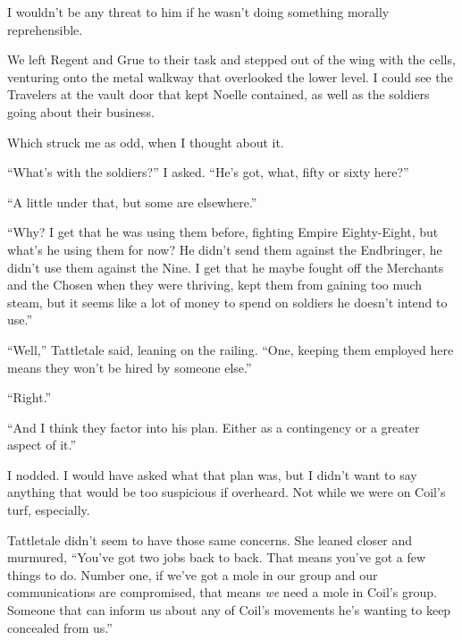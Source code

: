 I wouldn't be any threat to him if he wasn't doing something morally reprehensible.



We left Regent and Grue to their task and stepped out of the wing with the cells, venturing onto the metal walkway that overlooked the lower level.  I could see the Travelers at the vault door that kept Noelle contained, as well as the soldiers going about their business.



Which struck me as odd, when I thought about it.



``What's with the soldiers?'' I asked.  ``He's got, what, fifty or sixty here?''



``A little under that, but some are elsewhere.''



``Why?  I get that he was using them before, fighting Empire Eighty-Eight, but what's he using them for now?  He didn't send them against the Endbringer, he didn't use them against the Nine.  I get that he maybe fought off the Merchants and the Chosen when they were thriving, kept them from gaining too much steam, but it seems like a lot of money to spend on soldiers he doesn't intend to use.''



``Well,'' Tattletale said, leaning on the railing.  ``One, keeping them employed here means they won't be hired by someone else.''



``Right.''



``And I think they factor into his plan.  Either as a contingency or a greater aspect of it.''



I nodded.  I would have asked what that plan was, but I didn't want to say anything that would be too suspicious if overheard.  Not while we were on Coil's turf, especially.



Tattletale didn't seem to have those same concerns.  She leaned closer and murmured, ``You've got two jobs back to back.  That means you've got a few things to do.  Number one, if we've got a mole in our group and our communications are compromised, that means \emph{we} need a mole in Coil's group.  Someone that can inform us about any of Coil's movements he's wanting to keep concealed from us.''



